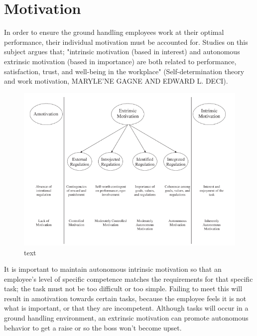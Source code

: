 \section{Motivation}

In order to ensure the ground handling employees work at their optimal performance, their individual motivation must be accounted for. Studies on this subject argues that; "intrinsic motivation (based in interest) and autonomous extrinsic motivation (based in importance) are both related to performance, satisfaction, trust, and well-being in the workplace" (Self-determination theory and work motivation, MARYLE'NE GAGNE AND EDWARD L. DECI).

\begin{figure}
\centering
\includegraphics[width=\textwidth]{Grafik/Motivation}
\caption{text}
\label{Hackman}
\end{figure}

It is important to maintain autonomous intrinsic motivation so that an employee's level of specific competence matches the requirements for that specific task; the task must not be too difficult or too simple. Failing to meet this will result in amotivation towards certain tasks, because the employee feels it is not what is important, or that they are incompetent. Although tasks will occur in a ground handling environment, an extrinsic motivation can promote autonomous behavior to get a raise or so the boss won't become upset.

